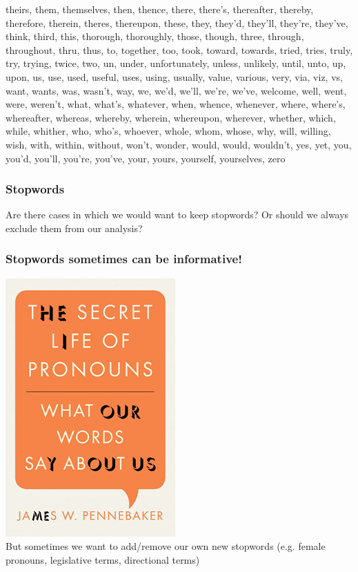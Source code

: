 \documentclass[notes=hide]{beamer}
\begin{document}
\begin{frame}
\begin{spacing}{.8}
theirs, them, themselves, then, thence, there, there's, thereafter, thereby, therefore, therein, theres, thereupon, these, they, they'd, they'll, they're, they've, think, third, this, thorough, thoroughly, those, though, three, through, throughout, thru, thus, to, together, too, took, toward, towards, tried, tries, truly, try, trying, twice, two, un, under, unfortunately, unless, unlikely, until, unto, up, upon, us, use, used, useful, uses, using, usually, value, various, very, via, viz, vs, want, wants, was, wasn't, way, we, we'd, we'll, we're, we've, welcome, well, went, were, weren't, what, what's, whatever, when, whence, whenever, where, where's, whereafter, whereas, whereby, wherein, whereupon, wherever, whether, which, while, whither, who, who's, whoever, whole, whom, whose, why, will, willing, wish, with, within, without, won't, wonder, would, would, wouldn't, yes, yet, you, you'd, you'll, you're, you've, your, yours, yourself, yourselves, zero
	\end{spacing}
\end{frame}

\begin{frame}
	\frametitle{Stopwords}
	\centering
	{\Large{Are there cases in which we would want to keep stopwords? Or should we always exclude them from our analysis?}}
\end{frame}


\begin{frame}
	\frametitle{Stopwords sometimes can be informative!}
	
	\centering\includegraphics[height=.7\textheight]{figures/pennebaker.png} \\
	But sometimes we want to add/remove our own new stopwords (e.g. female pronouns, legislative terms, directional terms)
\end{frame}
\end{document}
